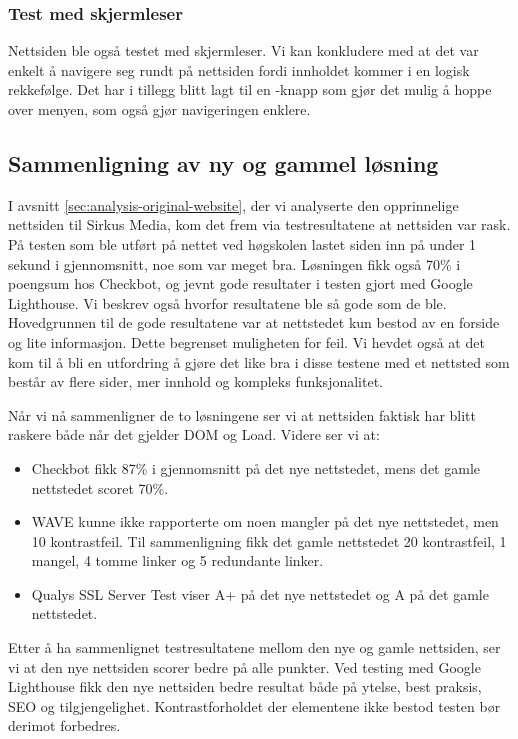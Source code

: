 \subsubsection{Test med skjermleser}
Nettsiden ble også testet med skjermleser. Vi kan konkludere med at det var enkelt å navigere seg rundt på nettsiden fordi innholdet kommer i en logisk rekkefølge. Det har i tillegg blitt lagt til en -knapp som gjør det mulig å hoppe over menyen, som også gjør navigeringen enklere.

\subsection{Sammenligning av ny og gammel løsning}
I avsnitt \ref{sec:analysis-original-website}, der vi analyserte den opprinnelige nettsiden til Sirkus Media, kom det frem via testresultatene at nettsiden var rask. På testen som ble utført på nettet ved høgskolen lastet siden inn på under 1 sekund i gjennomsnitt, noe som var meget bra. Løsningen fikk også 70\% i poengsum hos Checkbot, og jevnt gode resultater i testen gjort med Google Lighthouse. Vi beskrev også hvorfor resultatene ble så gode som de ble. Hovedgrunnen til de gode resultatene var at nettstedet kun bestod av en forside og lite informasjon. Dette begrenset muligheten for feil. Vi hevdet også at det kom til å bli en utfordring å gjøre det like bra i disse testene med et nettsted som består av flere sider, mer innhold og kompleks funksjonalitet.

Når vi nå sammenligner de to løsningene ser vi at nettsiden faktisk har blitt raskere både når det gjelder DOM og Load. Videre ser vi at:

\begin{itemize}
    \item Checkbot fikk 87\% i gjennomsnitt på det nye nettstedet, mens det gamle nettstedet scoret 70\%. 
    \item WAVE kunne ikke rapporterte om noen mangler på det nye nettstedet, men 10 kontrastfeil. Til sammenligning fikk det gamle nettstedet 20 kontrastfeil, 1 mangel, 4 tomme linker og 5 redundante linker.
    \item Qualys SSL Server Test viser A+ på det nye nettstedet og A på det gamle nettstedet.
\end{itemize}

Etter å ha sammenlignet testresultatene mellom den nye og gamle nettsiden, ser vi at den nye nettsiden scorer bedre på alle punkter. Ved testing med Google Lighthouse fikk den nye nettsiden bedre resultat både på ytelse, best praksis, SEO og tilgjengelighet. Kontrastforholdet der elementene ikke bestod testen bør derimot forbedres.

